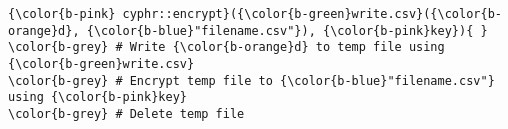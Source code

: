 \documentclass[class=minimal,border=0]{standalone}
\begin{document}
%
\begin{BVerbatim}[bgcolor=b-darkgrey]
{\color{b-pink} cyphr::encrypt}({\color{b-green}write.csv}({\color{b-orange}d}, {\color{b-blue}"filename.csv"}), {\color{b-pink}key}){ }
\color{b-grey} # Write {\color{b-orange}d} to temp file using {\color{b-green}write.csv}
\color{b-grey} # Encrypt temp file to {\color{b-blue}"filename.csv"} using {\color{b-pink}key}
\color{b-grey} # Delete temp file
\end{BVerbatim}
\end{document}
